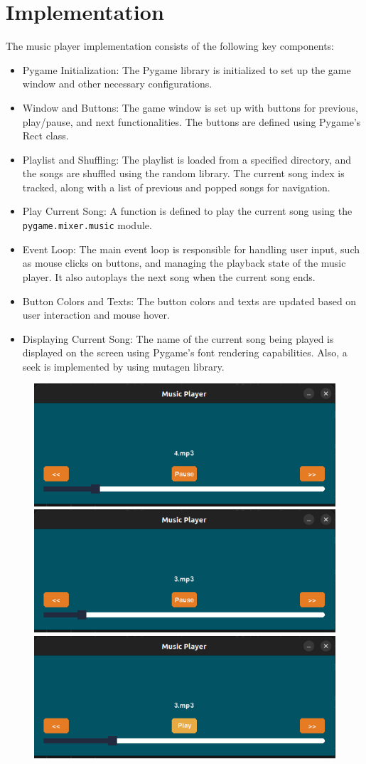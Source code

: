\documentclass[journal,12pt,twocolumn]{IEEEtran}
\begin{document}
\section{Implementation}
The music player implementation consists of the following key components:
\begin{itemize}
  \item Pygame Initialization: The Pygame library is initialized to set up the game window and other necessary configurations.
  \item Window and Buttons: The game window is set up with buttons for previous, play/pause, and next functionalities. The buttons are defined using Pygame's Rect class.
  \item Playlist and Shuffling: The playlist is loaded from a specified directory, and the songs are shuffled using the random library. The current song index is tracked, along with a list of previous and popped songs for navigation. 
  \item Play Current Song: A function is defined to play the current song using the \texttt{pygame.mixer.music} module.
  \item Event Loop: The main event loop is responsible for handling user input, such as mouse clicks on buttons, and managing the playback state of the music player. It also autoplays the next song when the current song ends.
  \item Button Colors and Texts: The button colors and texts are updated based on user interaction and mouse hover.
  \item Displaying Current Song: The name of the current song being played is displayed on the screen using Pygame's font rendering capabilities. Also, a seek is implemented by using mutagen library.
  \end{itemize}
  \begin{figure}[ht]
		\includegraphics[width=0.3\linewidth]{UI/UI1.png}
		\includegraphics[width=0.3\linewidth]{UI/UI2.png}
		\includegraphics[width=0.3\linewidth]{UI/UI3.png}
\end{figure}
\end{document}
